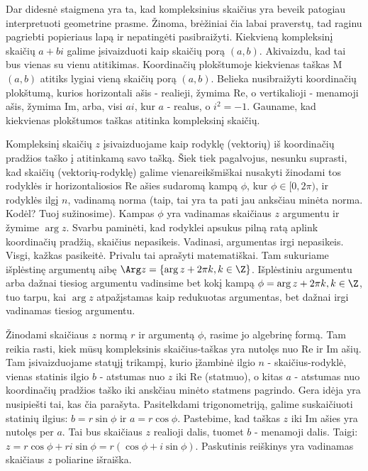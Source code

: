 Dar didesnė staigmena yra ta, kad kompleksinius skaičius yra beveik patogiau interpretuoti geometrine prasme. Žinoma, brėžiniai čia labai praverstų, tad raginu pagriebti popieriaus lapą ir nepatingėti pasibraižyti.
Kiekvieną kompleksinį skaičių $a+bi$ galime įsivaizduoti kaip skaičių porą $(a,b)$. Akivaizdu, kad tai bus vienas su vienu atitikimas. Koordinačių plokštumoje kiekvienas taškas M$(a,b)$ atitiks lygiai vieną skaičių porą $(a,b)$. Belieka nusibraižyti koordinačių plokštumą, kurios horizontali ašis - realieji, žymima Re, o vertikalioji - menamoji ašis, žymima Im, arba, visi $ai$, kur $a$ - realus,  o $i^2=-1$. Gauname, kad kiekvienas plokštumos taškas atitinka kompleksinį skaičių. 

Kompleksinį skaičių $z$ įsivaizduojame kaip rodyklę (vektorių) iš koordinačių pradžios taško į atitinkamą savo tašką. Šiek tiek pagalvojus, nesunku suprasti, kad skaičių (vektorių-rodyklę) galime vienareikšmiškai nusakyti žinodami tos rodyklės ir horizontaliosios Re ašies sudaromą kampą $\phi$, kur $\phi\in [ 0,2\pi )$, ir rodyklės ilgį $n$, vadinamą norma (taip, tai yra ta pati jau anksčiau minėta norma. Kodėl? Tuoj sužinosime). Kampas $\phi$ yra vadinamas skaičiaus $z$ argumentu ir žymime $\arg{z}$. Svarbu paminėti, kad rodyklei apsukus pilną ratą aplink koordinačių pradžią, skaičius nepasikeis. Vadinasi, argumentas irgi nepasikeis. Visgi, kažkas pasikeitė. Privalu tai aprašyti matematiškai. Tam sukuriame išplėstinę argumentų aibę $\Arg z=\{\arg z+2\pi k, k\in\Z\}$. Išplėstiniu argumentu arba dažnai tiesiog argumentu vadinsime bet kokį kampą $\phi=\arg z+2\pi k, k\in\Z$, tuo tarpu, kai $\arg z$ atpažįstamas kaip redukuotas argumentas, bet dažnai irgi vadinamas tiesiog argumentu. 

Žinodami skaičiaus $z$ normą $r$ ir argumentą $\phi$, rasime jo algebrinę formą. Tam reikia rasti, kiek mūsų kompleksinis skaičius-taškas yra nutolęs nuo Re ir Im ašių. Tam įsivaizduojame statųjį trikampį, kurio įžambinė ilgio $n$ - skaičius-rodyklė, vienas statinis ilgio $b$ - atstumas nuo $z$ iki Re (statmuo), o kitas $a$ - atstumas nuo koordinačių pradžios taško iki anskčiau minėto statmens pagrindo. Gera idėja yra nusipiešti tai, kas čia parašyta. Pasitelkdami trigonometriją, galime suskaičiuoti statinių ilgius: $b=r \sin \phi$ ir $a=r\cos\phi$. Pastebime, kad taškas $z$ iki Im ašies yra nutolęs per $a$. Tai bus skaičiaus $z$ realioji dalis, tuomet $b$ - menamoji dalis. Taigi: $z=r\cos\phi+ri\sin\phi=r(\cos\phi+i\sin\phi)$. Paskutinis reiškinys yra vadinamas skaičiaus $z$ poliarine išraiška.

